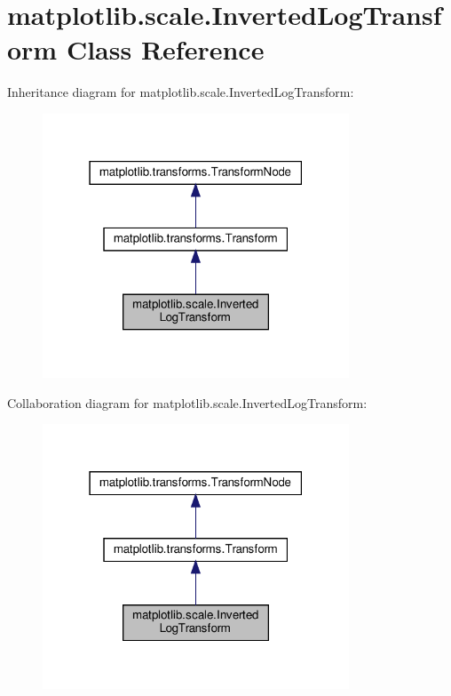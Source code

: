 \hypertarget{classmatplotlib_1_1scale_1_1InvertedLogTransform}{}\section{matplotlib.\+scale.\+Inverted\+Log\+Transform Class Reference}
\label{classmatplotlib_1_1scale_1_1InvertedLogTransform}


Inheritance diagram for matplotlib.\+scale.\+Inverted\+Log\+Transform\+:
\nopagebreak
\begin{figure}[H]
\begin{center}
\leavevmode
\includegraphics[width=259pt]{classmatplotlib_1_1scale_1_1InvertedLogTransform__inherit__graph}
\end{center}
\end{figure}


Collaboration diagram for matplotlib.\+scale.\+Inverted\+Log\+Transform\+:
\nopagebreak
\begin{figure}[H]
\begin{center}
\leavevmode
\includegraphics[width=259pt]{classmatplotlib_1_1scale_1_1InvertedLogTransform__coll__graph}
\end{center}
\end{figure}
